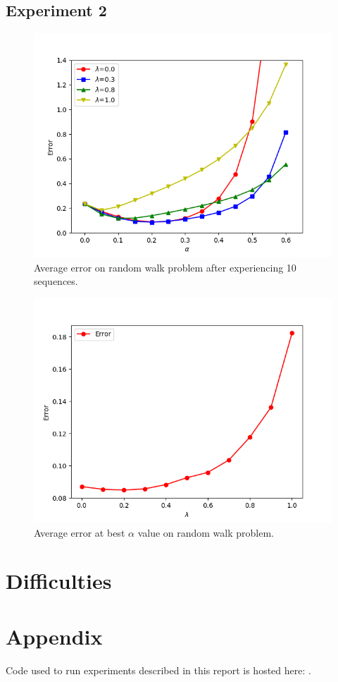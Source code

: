 \documentclass[10pt]{article}
\begin{document}
\subsection{Experiment 2} \label{results2}




\begin{figure}[h!]
  \centering
  \includegraphics[width=0.6\linewidth]{../results/experiment2.png}
     \caption{Average error on random walk problem after experiencing 10 sequences.}
  \label{fig:fig4}
\end{figure}

\begin{figure}[h!]
  \centering
  \includegraphics[width=0.6\linewidth]{../results/experiment3_2.png}
     \caption{Average error at best $\alpha$ value on random walk problem.}
  \label{fig:fig5}
\end{figure}





\section{Difficulties} \label{difficulties}













\section{Appendix} \label{appendix}
Code used to run experiments described in this report is hosted here: . 

%
%
\end{document}
